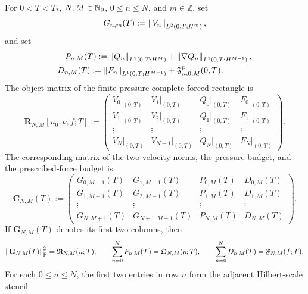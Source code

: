 \begin{proposition}
\label{prop:sobolev-rectangle-matrix}
For \(0<T<T_*\), \(N,M\in\mathbb N_0\), \(0\le n\le N\), and
\(m\in\mathbb Z\), set
\[
 G_{n,m}(T):=\left\lVert V_n\right\rVert_{L^2(0,T;H^m)},
\]
and set
\begin{align*}
 P_{n,M}(T):=\left\lVert Q_n\right\rVert_{L^1(0,T;H^M)}
 &+\left\lVert \nabla Q_n\right\rVert_{L^1(0,T;H^{M-1})},\\
 D_{n,M}(T):=\left\lVert F_n\right\rVert_{L^1(0,T;H^{M-1})}
 &+\mathfrak F^{\rm p}_{n,0,M}(0,T).
\end{align*}
The object matrix of the finite pressure-complete forced rectangle is
\begin{equation}
 \mathbf R_{N,M}[u_0,\nu,f;T]
 :=
 \begin{pmatrix}
  V_0|_{(0,T)}&V_1|_{(0,T)}&Q_0|_{(0,T)}&F_0|_{(0,T)}\\
  V_1|_{(0,T)}&V_2|_{(0,T)}&Q_1|_{(0,T)}&F_1|_{(0,T)}\\
  \vdots&\vdots&\vdots&\vdots\\
  V_N|_{(0,T)}&V_{N+1}|_{(0,T)}&Q_N|_{(0,T)}&F_N|_{(0,T)}
 \end{pmatrix}.
 \label{eq:finite-rectangle-object-matrix}
\end{equation}
The corresponding matrix of the two velocity norms, the pressure budget, and
the prescribed-force budget is
\begin{equation}
 \mathbf C_{N,M}(T)
 :=
 \begin{pmatrix}
  G_{0,M+1}(T)&G_{1,M-1}(T)&P_{0,M}(T)&D_{0,M}(T)\\
  G_{1,M+1}(T)&G_{2,M-1}(T)&P_{1,M}(T)&D_{1,M}(T)\\
  \vdots&\vdots&\vdots&\vdots\\
  G_{N,M+1}(T)&G_{N+1,M-1}(T)&P_{N,M}(T)&D_{N,M}(T)
 \end{pmatrix}.
 \label{eq:sobolev-pressure-complete-rectangle-matrix}
\end{equation}
If \(\mathbf G_{N,M}(T)\) denotes its first two columns, then
\begin{equation}
 \left\lVert \mathbf G_{N,M}(T)\right\rVert_{\mathrm F}^2
 =\mathfrak R_{N,M}(u;T),
 \qquad
 \sum_{n=0}^NP_{n,M}(T)=\mathfrak Q_{N,M}(p;T),
 \qquad
 \sum_{n=0}^ND_{n,M}(T)=\mathfrak F_{N,M}(f;T).
 \label{eq:rectangle-matrix-norm-identities}
\end{equation}
For each \(0\le n\le N\), the first two entries in row \(n\) form the
adjacent Hilbert-scale stencil
\begin{equation}
 \left.
 \begin{array}{c}

\end{array}
\end{equation}
\end{proposition}
